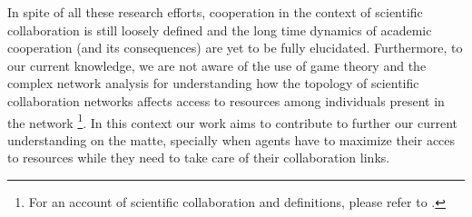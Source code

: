 \documentclass[11pt]{article}
\begin{document}
In spite of all these research efforts, cooperation in the context of scientific
collaboration is still loosely defined and the long time dynamics of academic
cooperation (and its consequences) are yet to be fully elucidated. Furthermore,
to our current knowledge, we are not aware of the use of game theory and
the complex network analysis for understanding how the topology of scientific collaboration networks
affects access to resources among individuals present in the network \footnote{For
  an account of scientific collaboration and definitions, please refer to
  \cite{Sonnenwald2007}.}. In this context our work aims to contribute to
further our current understanding on the matte, specially when agents have to
maximize their acces to resources while they need to take care of their collaboration links.\\  







\end{document}
